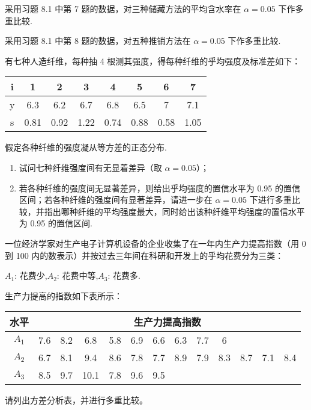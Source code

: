 \begin{xiti}
  \item 采用习题 8.1 中第 7 题的数据，对三种储藏方法的平均含水率在 $\alpha = 0.05$ 下作多重比较.
  \item 采用习题 8.1 中第 8 题的数据，对五种推销方法在 $\alpha = 0.05$ 下作多重比较.
  \item 有七种人造纤维，每种抽 4 根测其强度，得每种纤维的乎均强度及标准差如下：
  \begin{center}
    \begin{tabular}{cccccccc}
      \toprule
      i     & 1     & 2     & 3     & 4     & 5     & 6     & 7 \\
      \midrule
      y     & 6.3   & 6.2   & 6.7   & 6.8   & 6.5   & 7     & 7.1 \\
      s     & 0.81  & 0.92  & 1.22  & 0.74  & 0.88  & 0.58  & 1.05 \\
      \bottomrule
      \end{tabular}%
  \end{center}
  假定各种纤维的强度凝从等方差的正态分布.
  \begin{enumerate}
    \item 试问七种纤维强度间有无显着差异（取 $\alpha=0.05$）；
    \item 若各种纤维的强度间无显著差异，则给出乎均强度的置信水平为 0.95 的置信区间；若各种纤维的强度间有显著差异，请进一步在 $\alpha=0.05$ 下进行多重比较，并指出哪种纤维的平均强度最大，同时给出该种纤维平均强度的置信水平为 0.95 的置信区间.
  \end{enumerate}
  \item 一位经济学家对生产电子计算机设备的企业收集了在一年内生产力提高指数（用 0 到 100 内的数表示）并按过去三年间在科研和开发上的乎均花费分为三类：
  \begin{center}
    $A_1$: 花费少,\quad $A_2$: 花费中等,\quad $A_3$: 花费多.
  \end{center}
生产力提高的指数如下表所示：
\begin{center}
  \begin{tabular}{ccccccccccccc}
    \toprule
    水平    & \multicolumn{12}{c}{生产力提高指数} \\
    \midrule
    $A_1$    & 7.6   & 8.2   & 6.8   & 5.8   & 6.9   & 6.6   & 6.3   & 7.7   & 6     &       &       &  \\
    $A_2$    & 6.7   & 8.1   & 9.4   & 8.6   & 7.8   & 7.7   & 8.9   & 7.9   & 8.3   & 8.7   & 7.1   & 8.4 \\
    $A_3$    & 8.5   & 9.7   & 10.1  & 7.8   & 9.6   & 9.5   &       &       &       &       &       &  \\
    \bottomrule
    \end{tabular}%
\end{center}
请列出方差分析表，并进行多重比较。
\end{xiti}

